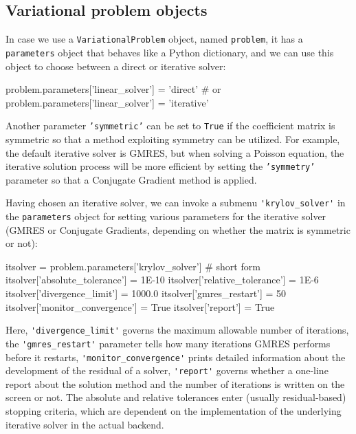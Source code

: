 \subsection{Variational problem objects}

In case we use a {\fontsize{10pt}{10pt}\texttt{VariationalProblem}} object, named {\fontsize{10pt}{10pt}\texttt{problem}},
it has a {\fontsize{10pt}{10pt}\texttt{parameters}} object that behaves like a Python dictionary,
and we can use this object to choose between a direct or iterative
solver:
\begin{python}
problem.parameters['linear_solver'] = 'direct'
# or
problem.parameters['linear_solver'] = 'iterative'
\end{python}
Another parameter {\fontsize{10pt}{10pt}\texttt{'symmetric'}} can be set to {\fontsize{10pt}{10pt}\texttt{True}}
if the coefficient matrix is symmetric so that
a method exploiting symmetry can be utilized.
For example, the default iterative solver is GMRES, but when solving
a Poisson equation, the iterative solution process will be more
efficient by setting the {\fontsize{10pt}{10pt}\texttt{'symmetry'}} parameter
so that a Conjugate Gradient method is applied.

Having chosen an iterative solver, we can invoke 
a submenu {\fontsize{10pt}{10pt}\verb!'krylov_solver'!}
in the
{\fontsize{10pt}{10pt}\texttt{parameters}} object for setting various parameters for 
the iterative solver (GMRES or Conjugate Gradients, depending on
whether the matrix is symmetric or not):
\begin{python}
itsolver = problem.parameters['krylov_solver'] # short form
itsolver['absolute_tolerance'] = 1E-10
itsolver['relative_tolerance'] = 1E-6
itsolver['divergence_limit'] = 1000.0
itsolver['gmres_restart'] = 50
itsolver['monitor_convergence'] = True
itsolver['report'] = True
\end{python}
Here, {\fontsize{10pt}{10pt}\verb!'divergence_limit'!} 
governs the maximum allowable number of iterations,
the {\fontsize{10pt}{10pt}\verb!'gmres_restart'!} parameter tells how many iterations GMRES performs before
it restarts,
{\fontsize{10pt}{10pt}\verb!'monitor_convergence'!} prints detailed information about the
development of the residual of a solver,
{\fontsize{10pt}{10pt}\verb!'report'!} governs whether a one-line report about the solution
method and the number of iterations
is written on the screen or not. The absolute and relative tolerances
enter (usually residual-based) stopping criteria, which are dependent on
the implementation of the underlying iterative solver in the actual backend.

